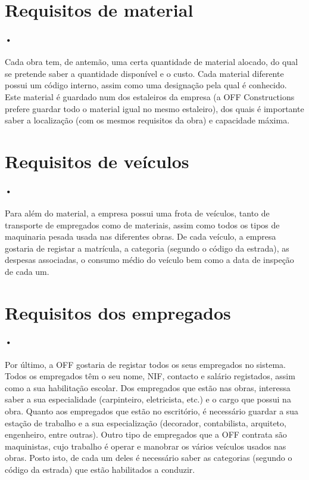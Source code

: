 \documentclass{report}
\begin{document}
		\section{Requisitos de material}
			
			\paragraph{•}Cada obra tem, de antemão, uma certa quantidade de material
			alocado, do qual se pretende saber a quantidade disponível e o custo. Cada
			material diferente possui um código interno, assim como uma designação pela qual
			é conhecido. Este material é guardado num dos estaleiros da empresa (a OFF
			Constructions prefere guardar todo o material igual no mesmo estaleiro), dos
			quais é importante saber a localização (com os mesmos requisitos da obra) e
			capacidade máxima.
			
		\section{Requisitos de veículos}
		
			\paragraph{•}Para além do material, a empresa possui uma frota de veículos,
			tanto de transporte de empregados como de materiais, assim como todos os tipos
			de maquinaria pesada usada nas diferentes obras. De cada veículo, a empresa
			gostaria de registar a matrícula, a categoria (segundo o código da estrada), as
			despesas associadas, o consumo médio do veículo bem como a data de inspeção de
			cada um.
			
		\section{Requisitos dos empregados}
		
			\paragraph{•}Por último, a OFF gostaria de registar todos os seus empregados no
			sistema. Todos os empregados têm o seu nome, NIF, contacto e salário registados,
			assim como a sua habilitação escolar. Dos empregados que estão nas obras,
			interessa saber a sua especialidade (carpinteiro, eletricista, etc.) e o cargo
			que possui na obra. Quanto aos empregados que estão no escritório, é necessário
			guardar a sua estação de trabalho e a sua especialização (decorador,
			contabilista, arquiteto, engenheiro, entre outras). Outro tipo de empregados que
			a OFF contrata são maquinistas, cujo trabalho é operar e manobrar os vários
			veículos usados nas obras. Posto isto, de cada um deles é necessário saber as
			categorias (segundo o código da estrada) que estão habilitados a conduzir.
				
\end{document}
